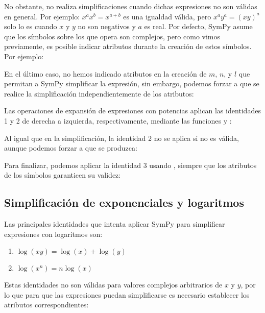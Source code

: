 No obstante, no realiza simplificaciones cuando dichas expresiones no son válidas en general. Por ejemplo: $x^a x^b = x^{a + b}$ es una igualdad válida, pero $x^a y^a = (xy)^a$ solo lo es cuando $x$ y $y$ no son negativos y $a$ es real. Por defecto, SymPy asume que los símbolos sobre los que opera son complejos, pero como vimos previamente, es posible indicar atributos durante la creación de estos símbolos. Por ejemplo:


En el último caso, no hemos indicado atributos en la creación de $m$, $n$, y $l$ que permitan a SymPy simplificar la expresión, sin embargo, podemos forzar a que se realice la simplificación independientemente de los atributos:


Las operaciones de expansión de expresiones con potencias aplican las identidades 1 y 2 de derecha a izquierda, respectivamente, mediante las funciones  y :


Al igual que en la simplificación, la identidad 2 no se aplica si no es válida, aunque podemos forzar a que se produzca:


Para finalizar, podemos aplicar la identidad 3 usando , siempre que los atributos de los símbolos garanticen su validez:


\subsection{Simplificación de exponenciales y logaritmos}
Las principales identidades que intenta aplicar SymPy para simplificar expresiones con logaritmos son:
\begin{enumerate}
    \item $\log(x y) = \log(x) + \log(y)$
    \item $\log(x^n) = n \log(x)$
\end{enumerate}

Estas identidades no son válidas para valores complejos arbitrarios de $x$ y $y$, por lo que para que las expresiones puedan simplificarse es necesario establecer los atributos correspondientes:

